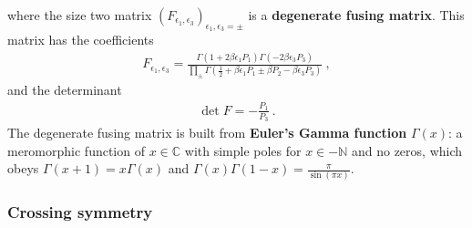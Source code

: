 \documentclass[12pt, a4paper]{article}
\theoremstyle{break}
\begin{document}
where the size two matrix $\left(F_{\epsilon_1,\epsilon_3}\right)_{\epsilon_1,\epsilon_3=\pm}$ is a \textbf{degenerate fusing matrix}. This matrix has the coefficients 
\begin{align}
 \boxed{F_{\epsilon_1,\epsilon_3} = \frac{\Gamma(1+2\beta\epsilon_1P_1)\Gamma(-2\beta \epsilon_3P_3)}{\prod_\pm \Gamma(\frac12 +\beta \epsilon_1P_1 \pm \beta P_2 -\beta \epsilon_3P_3)}}\ ,
 \label{fee}
\end{align}
and the determinant 
\begin{align}
 \det F = -\frac{P_1}{P_3}\ .
 \label{detf}
\end{align}
The degenerate fusing matrix is built from \textbf{Euler's Gamma function} $\Gamma(x)$: a meromorphic function of $x\in\mathbb{C}$ with simple poles for $x\in -\mathbb{N}$ and no zeros, which obeys $\Gamma(x+1)=x\Gamma(x)$ and $\Gamma(x)\Gamma(1-x)=\frac{\pi}{\sin(\pi x)}$. 

\subsubsection{Crossing symmetry}
\end{document}
